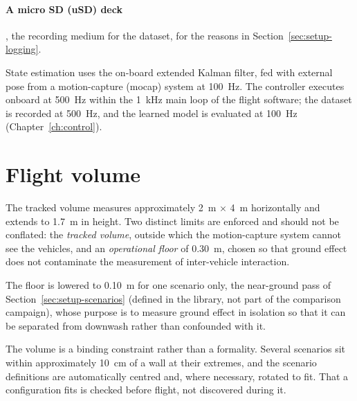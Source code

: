 \paragraph{A micro SD (uSD) deck}, the recording medium for the dataset, for the reasons in
Section~\ref{sec:setup-logging}.

State estimation uses the on-board extended Kalman filter, fed with external pose from a
motion-capture (mocap) system at \SI{100}{\hertz}. The controller executes onboard at
\SI{500}{\hertz} within the \SI{1}{\kilo\hertz} main loop of the flight software; the dataset is
recorded at \SI{500}{\hertz}, and the learned model is evaluated at \SI{100}{\hertz}
(Chapter~\ref{ch:control}).

\section{Flight volume}
\label{sec:setup-volume}

The tracked volume measures approximately \SI{2}{\metre} $\times$ \SI{4}{\metre} horizontally and
extends to \SI{1.7}{\metre} in height. Two distinct limits are enforced and should not be
conflated: the \emph{tracked volume}, outside which the motion-capture system cannot see the
vehicles, and an \emph{operational floor} of \SI{0.30}{\metre}, chosen so that ground effect does
not contaminate the measurement of inter-vehicle interaction.

The floor is lowered to \SI{0.10}{\metre} for one scenario only, the near-ground pass of Section~\ref{sec:setup-scenarios} (defined in the library, not part of the comparison campaign), whose purpose is to measure ground effect in isolation so that
it can be separated from downwash rather than confounded with it.

The volume is a binding constraint rather than a formality. Several scenarios sit within
approximately \SI{10}{\centi\metre} of a wall at their extremes, and the scenario definitions are
automatically centred and, where necessary, rotated to fit. That a configuration fits is checked
before flight, not discovered during it.


